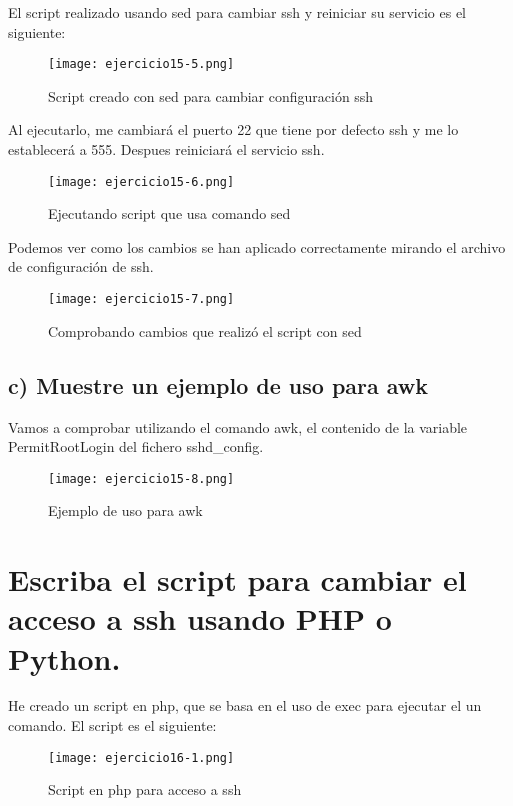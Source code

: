	El script realizado usando sed\cite{ejercicio15-4} para cambiar ssh y reiniciar su servicio es el siguiente:
		\begin{figure}[H]	
			\centering
			\texttt{[image: ejercicio15-5.png]} 
			\label{figura106} 
			\caption{Script creado con sed para cambiar configuración ssh}
		\end{figure}
	
	Al ejecutarlo, me cambiará el puerto 22 que tiene por defecto ssh y me lo establecerá a 555. Despues reiniciará el servicio ssh.
		\begin{figure}[H]	
			\centering
			\texttt{[image: ejercicio15-6.png]} 
			\label{figura107} 
			\caption{Ejecutando script que usa comando sed}
		\end{figure}
	Podemos ver como los cambios se han aplicado correctamente mirando el archivo de configuración de ssh.
		\begin{figure}[H]	
			\centering
			\texttt{[image: ejercicio15-7.png]} 
			\label{figura108} 
			\caption{Comprobando cambios que realizó el script con sed}
		\end{figure}
	
	\subsection{c) Muestre un ejemplo de uso para awk}
	
	Vamos a comprobar utilizando el comando awk\cite{ejercicio15-4}, el contenido de la variable PermitRootLogin del fichero sshd\_config.
	
	\begin{figure}[H]	
		\centering
		\texttt{[image: ejercicio15-8.png]} 
		\label{figura109} 
		\caption{Ejemplo de uso para awk}
	\end{figure} 
	
	\section{Escriba el script para cambiar el acceso a ssh usando PHP o Python.}
	
	He creado un script en php, que se basa en el uso de exec para ejecutar el un comando\cite{ejercicio16-1,ejercicio16-2}. El script es el siguiente:
		\begin{figure}[H]	
			\centering
			\texttt{[image: ejercicio16-1.png]} 
			\label{figura110} 
			\caption{Script en php para acceso a ssh}
		\end{figure}
	
